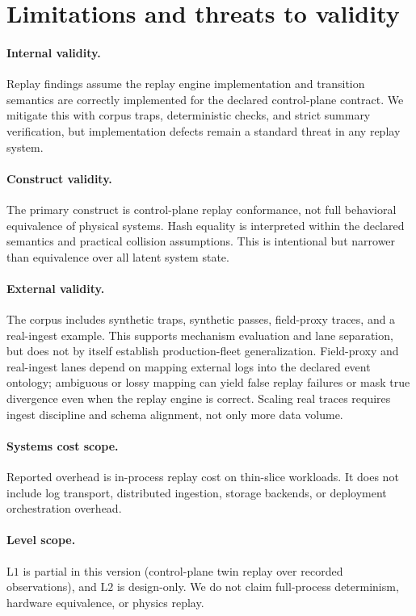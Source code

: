 \documentclass[11pt]{article}
\newcommand{\Lone}{\ensuremath{\mathrm{L1}}}
\newcommand{\Ltwo}{\ensuremath{\mathrm{L2}}}
\begin{document}
\section{Limitations and threats to validity}

\paragraph{Internal validity.}
Replay findings assume the replay engine implementation and transition semantics are correctly implemented for the declared control-plane contract. We mitigate this with corpus traps, deterministic checks, and strict summary verification, but implementation defects remain a standard threat in any replay system.

\paragraph{Construct validity.}
The primary construct is control-plane replay conformance, not full behavioral equivalence of physical systems. Hash equality is interpreted within the declared semantics and practical collision assumptions. This is intentional but narrower than equivalence over all latent system state.

\paragraph{External validity.}
The corpus includes synthetic traps, synthetic passes, field-proxy traces, and a real-ingest example. This supports mechanism evaluation and lane separation, but does not by itself establish production-fleet generalization. Field-proxy and real-ingest lanes depend on mapping external logs into the declared event ontology; ambiguous or lossy mapping can yield false replay failures or mask true divergence even when the replay engine is correct. Scaling real traces requires ingest discipline and schema alignment, not only more data volume.

\paragraph{Systems cost scope.}
Reported overhead is in-process replay cost on thin-slice workloads. It does not include log transport, distributed ingestion, storage backends, or deployment orchestration overhead.

\paragraph{Level scope.}
\Lone{} is partial in this version (control-plane twin replay over recorded observations), and \Ltwo{} is design-only. We do not claim full-process determinism, hardware equivalence, or physics replay.
\end{document}
